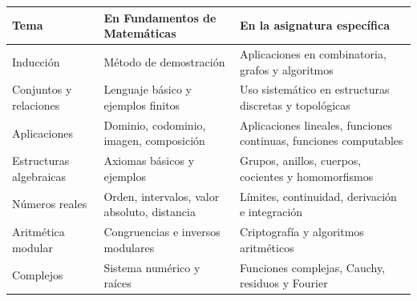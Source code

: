 \begin{center}
\begin{tabular}{p{}p{}p{}}
\toprule
\textbf{Tema} & \textbf{En Fundamentos de Matemáticas} & \textbf{En la asignatura específica} \\
\midrule
Inducción & Método de demostración & Aplicaciones en combinatoria, grafos y algoritmos \\
Conjuntos y relaciones & Lenguaje básico y ejemplos finitos & Uso sistemático en estructuras discretas y topológicas \\
Aplicaciones & Dominio, codominio, imagen, composición & Aplicaciones lineales, funciones continuas, funciones computables \\
Estructuras algebraicas & Axiomas básicos y ejemplos & Grupos, anillos, cuerpos, cocientes y homomorfismos \\
Números reales & Orden, intervalos, valor absoluto, distancia & Límites, continuidad, derivación e integración \\
Aritmética modular & Congruencias e inversos modulares & Criptografía y algoritmos aritméticos \\
Complejos & Sistema numérico y raíces & Funciones complejas, Cauchy, residuos y Fourier \\
\bottomrule
\end{tabular}
\end{center}

